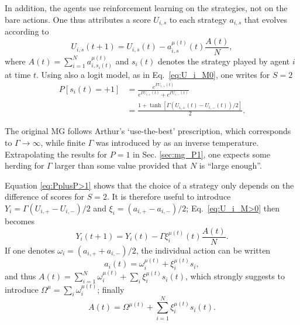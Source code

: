 \documentclass[aps,twocolumn,nofootinbib,sortedaddress,reprint]{revtex4-1}
\begin{document}
In addition, the agents use reinforcement learning on the strategies,
not on the bare actions. One thus attributes a score $U_{i,s}$ to each
strategy $a_{i,s}$ that evolves according to
\begin{equation}\label{eq:U_i_M>0}
U_{i,s}(t+1)=U_{i,s}(t)-a_{i,s}^{\mu(t)}(t)\frac{A(t)}{N},
\end{equation}
where $A(t)=\sum_{i=1}^N a_{i,s_i(t)}^{\mu(t)}$ and $s_i(t)$ denotes
the strategy played by agent $i$ at time $t$. Using also a logit
model, as in Eq.~\eqref{eq:U_i_M0}, one writes for $S=2$
\begin{align}\nonumber
P[s_{i}(t)=+1]&=\frac{e^{\Gamma U_{i,+}(t)}}{e^{\Gamma
    U_{i,+}(t)}+e^{\Gamma U_{i,-}(t)}}\\ &=\frac{1+\tanh[\Gamma
    (U_{i,+}(t)-U_{i,-}(t))/2]}{2}\label{eq:PplusP>1}.
\end{align}

The original MG follows Arthur's `use-the-best' prescription, which
corresponds to $\Gamma\to\infty$, while finite $\Gamma$ was introduced
by \textcite{Oxf1} as an inverse temperature. Extrapolating the
results for $P=1$ in Sec. \ref{sec:mg_P1}, one expects some herding
for $\Gamma$ larger than some value provided that $N$ is ``large
enough''.

Equation \eqref{eq:PplusP>1} shows that the choice of a strategy only
depends on the difference of scores for $S=2$. It is therefore useful to
introduce $Y_i=\Gamma(U_{i,+}-U_{i,-})/2$ and
$\xi_{i}=(a_{i,+}-a_{i,-})/2$; Eq.\ \eqref{eq:U_i_M>0} then becomes
\begin{equation}\label{eq:q_i(t)}
Y_{i}(t+1)=Y_{i}(t)-\Gamma\xi_{i}^{\mu(t)}(t)\frac{A(t)}{N}.
\end{equation}
If one denotes $\omega_{i}=(a_{i,+}+a_{i,-})/2$, the individual action
can be written
\begin{equation}\label{eq:a_omega_xi_si}
a_i(t)=\omega_i^{\mu(t)}+\xi_i^{\mu(t)}s_i,
\end{equation}
 and thus  $A(t)=\sum_{i=1}^N\omega_i^{\mu(t)}+\sum_i\xi_i^{\mu(t)}s_i(t)$,
 which strongly suggests to introduce
 $\Omega^\mu=\sum_i\omega_i^{\mu(t)}$; finally
\begin{equation}\label{eq:A_Om_xi}
A(t)=\Omega^{\mu(t)}+\sum_{i=1}^N\xi_i^{\mu(t)}s_i(t).
\end{equation}
\end{document}
